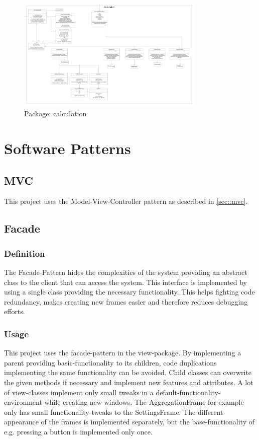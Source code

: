 \documentclass[letterpaper,10pt,english]{sphinxmanual}
\begin{document}
\hypertarget{calculation}{
\begin{figure}[hbt!]
  \centering
\includegraphics[width=0.8\textwidth]
        {pictures/calculation.png}
  \caption{Package: calculation}
  \label{fig:mvc}
\end{figure}
}
\newpage



\chapter{Software Patterns}
\label{\detokenize{index:software-patterns}}
\sphinxstepscope
\section{MVC}
This project uses the Model-View-Controller pattern as described in \ref{sec::mvc}.

\section{Facade}
\subsection{Definition}
The Facade-Pattern hides the complexities of the system providing an abstract class to the client that can access the system. This interface is implemented by using a single class providing the necessary functionality. This helps fighting code redundancy, makes creating new frames easier and therefore reduces debugging efforts.
\subsection{Usage}
This project uses the facade-pattern in the view-package. By implementing a parent providing basic-functionality to its children, code duplications implementing the same functionality can be avoided. Child classes can overwrite the given methods if necessary and implement new features and attributes.
A lot of view-classes implement only small tweaks in a default-functionality-environment while creating new windows. The AggregationFrame for example only has small functionality-tweaks to the SettingsFrame. The different appearance of the frames is implemented separately, but the base-functionality of e.g. pressing a button is implemented only once.
\end{document}
